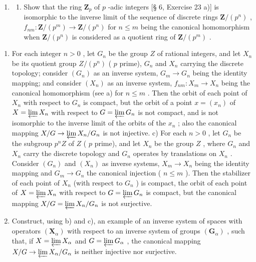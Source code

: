 \BourbakiExerciseGroup

\begin{enumerate}
\def\labelenumi{\arabic{enumi})}
\tightlist
\item
  \begin{enumerate}
  \def\labelenumii{\alph{enumii})}
  \tightlist
  \item
    Show that the ring \(\mathbf{Z}_p\) of \(p\) -adic integers {[}§ 6, Exercise 23 a){]} is isomorphic to the inverse limit of the sequence of discrete rings \(\mathbf{Z}/(p^n)\) , \(f_{nm}: \mathbf{Z}/(p^m) \to \mathbf{Z}/(p^n)\) for \(n \leqslant m\) being the canonical homomorphism when \(\mathbf{Z}/(p^n)\) is considered as a quotient ring of \(\mathbf{Z}/(p^m)\) .
  \end{enumerate}
\end{enumerate}

\begin{enumerate}
\def\labelenumi{\alph{enumi})}
\setcounter{enumi}{1}
\item
  For each integer \(n > 0\) , let \(G_n\) be the group \(Z\) of rational integers, and let \(X_n\) be its quotient group \(Z/(p^n)\) ( \(p\) prime), \(G_n\) and \(X_n\) carrying the discrete topology; consider \((G_n)\) as an inverse system, \(G_m \to G_n\) being the identity mapping; and consider \((X_n)\) as an inverse system, \(f_{nm}: X_m \to X_n\) being the canonical homomorphism (see a) for \(n \leqslant m\) . Then the orbit of each point of \(X_n\) with respect to \(G_n\) is compact, but the orbit of a point \(x = (x_n)\) of \(X = \varprojlim X_n\) with respect to \(G = \varprojlim G_n\) is not compact, and is not isomorphic to the inverse limit of the orbits of the \(x_n\) ; also the canonical mapping \(X/G \to \varprojlim X_n/G_n\) is not injective. c) For each \(n > 0\) , let \(G_n\) be the subgroup \(p^n Z\) of \(Z\) ( \(p\) prime), and let \(X_n\) be the group \(Z\) , where \(G_n\) and \(X_n\) carry the discrete topology and \(G_n\) operates by translations on \(X_n\) . Consider \((G_n)\) and \((X_n)\) as inverse systems, \(X_m \to X_n\) being the identity mapping and \(G_m \to G_n\) the canonical injection ( \(n \leqslant m\) ). Then the stabilizer of each point of \(X_n\) (with respect to \(G_n\) ) is compact, the orbit of each point of \(X = \varprojlim X_n\) with respect to \(G = \varprojlim G_n\) is compact, but the canonical mapping \(X/G = \varprojlim X_n/G_n\) is not surjective.
\item
  Construct, using b) and c), an example of an inverse system of spaces with operators \((\mathbf{X}_{\alpha})\) with respect to an inverse system of groups \((\mathbf{G}_{\alpha})\) , such that, if \(X = \varprojlim X_{\alpha}\) and \(G = \varprojlim G_{\alpha}\) , the canonical mapping \(X/G \to \varprojlim X_{\alpha}/G_{\alpha}\) is neither injective nor surjective.
\end{enumerate}

